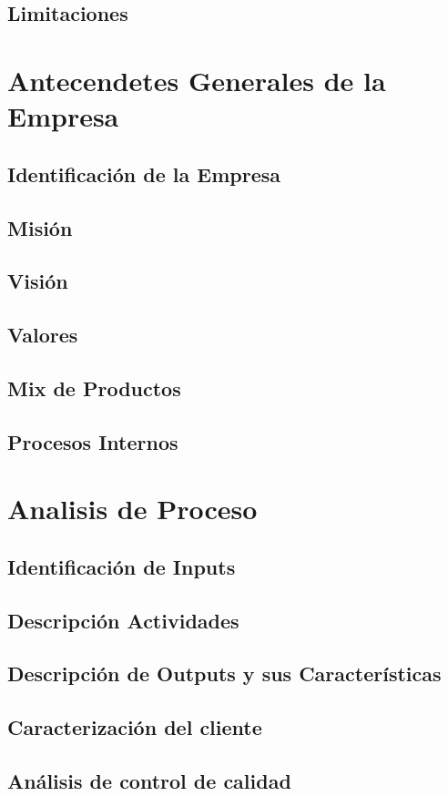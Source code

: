 	\subsection{Limitaciones}
\section{Antecendetes Generales de la Empresa}
	\subsection{Identificación de la Empresa}
	\subsection{Misión}
	\subsection{Visión}
	\subsection{Valores}
	\subsection{Mix de Productos}
	\subsection{Procesos Internos}
\section{Analisis de Proceso}
	\subsection{Identificación de Inputs}
	\subsection{Descripción Actividades}
	\subsection{Descripción de Outputs y sus Características}
	\subsection{Caracterización del cliente}
	\subsection{Análisis de control de calidad}
